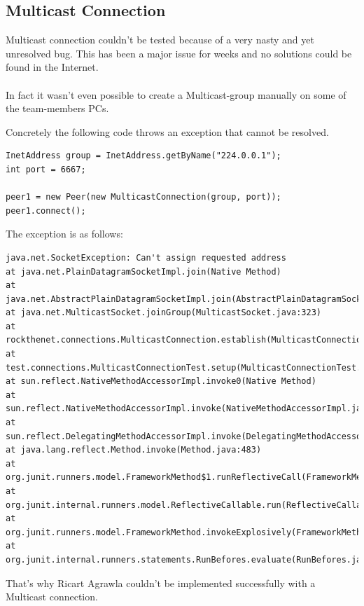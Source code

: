 \documentclass[11pt, a4paper]{article}
\begin{document}
\subsection{Multicast Connection}

Multicast connection couldn't be tested because of a very nasty and yet unresolved bug. This has been a major issue for weeks and no solutions could be found in the Internet. 
\\\\
In fact it wasn't even possible to create a Multicast-group manually on some of the team-members PCs.

Concretely the following code throws an exception that cannot be resolved. 

\begin{lstlisting}
InetAddress group = InetAddress.getByName("224.0.0.1");
int port = 6667;

peer1 = new Peer(new MulticastConnection(group, port));
peer1.connect();
\end{lstlisting}

The exception is as follows:

\begin{lstlisting}
java.net.SocketException: Can't assign requested address
at java.net.PlainDatagramSocketImpl.join(Native Method)
at java.net.AbstractPlainDatagramSocketImpl.join(AbstractPlainDatagramSocketImpl.java:178)
at java.net.MulticastSocket.joinGroup(MulticastSocket.java:323)
at rockthenet.connections.MulticastConnection.establish(MulticastConnection.java:48)
at test.connections.MulticastConnectionTest.setup(MulticastConnectionTest.java:29)
at sun.reflect.NativeMethodAccessorImpl.invoke0(Native Method)
at sun.reflect.NativeMethodAccessorImpl.invoke(NativeMethodAccessorImpl.java:62)
at sun.reflect.DelegatingMethodAccessorImpl.invoke(DelegatingMethodAccessorImpl.java:43)
at java.lang.reflect.Method.invoke(Method.java:483)
at org.junit.runners.model.FrameworkMethod$1.runReflectiveCall(FrameworkMethod.java:47)
at org.junit.internal.runners.model.ReflectiveCallable.run(ReflectiveCallable.java:12)
at org.junit.runners.model.FrameworkMethod.invokeExplosively(FrameworkMethod.java:44)
at org.junit.internal.runners.statements.RunBefores.evaluate(RunBefores.java:24)
\end{lstlisting}

That's why Ricart Agrawla couldn't be implemented successfully with a Multicast connection. 

\nocite{*}

{}
\end{document}

